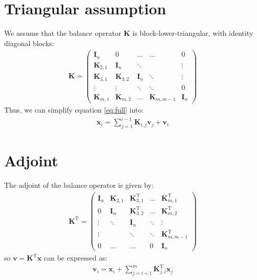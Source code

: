 \documentclass[12pt]{article}
\begin{document}
\section{Triangular assumption}
We assume that the balance operator $\mathbf{K}$ is block-lower-triangular, with identity diagonal blocks:
\begin{align}
\mathbf{K} = \left(\begin{array}{ccccc}
\mathbf{I}_n & 0 & \dots & \dots & 0 \\
\mathbf{K}_{2,1} & \mathbf{I}_n & \ddots & & \vdots \\
\mathbf{K}_{3,1} & \mathbf{K}_{3,2} & \mathbf{I}_n & \ddots & \vdots \\
\vdots & \vdots & \ddots & \ddots & 0 \\
\mathbf{K}_{m,1} & \mathbf{K}_{m,2} & \dots & \mathbf{K}_{m,m-1} & \mathbf{I}_n
\end{array} \right) 
\end{align}
Thus, we can simplify equation \eqref{eq:full} into:
\begin{align}
\label{eq:triangle}
\mathbf{x}_i = \sum_{j=1}^{i-1} \mathbf{K}_{i,j} \mathbf{v}_j + \mathbf{v}_i
\end{align}

\section{Adjoint}
The adjoint of the balance operator is given by: 
\begin{align}
\mathbf{K}^\mathrm{T} = \left(\begin{array}{ccccc}
\mathbf{I}_n & \mathbf{K}_{2,1} & \mathbf{K}^\mathrm{T}_{3,1} & \dots & \mathbf{K}^\mathrm{T}_{m,1} \\
0 & \mathbf{I}_n & \mathbf{K}^\mathrm{T}_{3,2} & \dots & \mathbf{K}^\mathrm{T}_{m,2} \\
\vdots & \ddots & \mathbf{I}_n & \ddots & \vdots \\
\vdots &  & \ddots & \ddots & \mathbf{K}^\mathrm{T}_{m,m-1} \\
0 & \dots & \dots & 0 & \mathbf{I}_n
\end{array} \right) 
\end{align}
so $\mathbf{v} = \mathbf{K}^\mathrm{T} \mathbf{x}$ can be expressed as:
\begin{align}
\label{eq:triangle_ad}
\mathbf{v}_i = \mathbf{x}_i + \sum_{j=i+1}^{m} \mathbf{K}^\mathrm{T}_{j,i} \mathbf{x}_j
\end{align}
\end{document}

